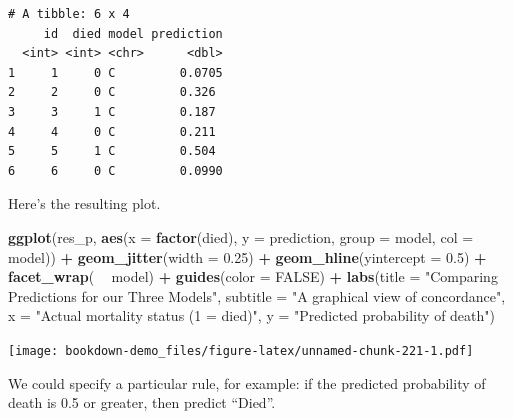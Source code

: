 \documentclass[]{book}
\newenvironment{Shaded}{\begin{snugshade}}{\end{snugshade}}
\newcommand{\KeywordTok}[1]{\textcolor[rgb]{0.13,0.29,0.53}{\textbf{#1}}}
\newcommand{\DataTypeTok}[1]{\textcolor[rgb]{0.13,0.29,0.53}{#1}}
\newcommand{\DecValTok}[1]{\textcolor[rgb]{0.00,0.00,0.81}{#1}}
\newcommand{\FloatTok}[1]{\textcolor[rgb]{0.00,0.00,0.81}{#1}}
\newcommand{\StringTok}[1]{\textcolor[rgb]{0.31,0.60,0.02}{#1}}
\newcommand{\OtherTok}[1]{\textcolor[rgb]{0.56,0.35,0.01}{#1}}
\newcommand{\OperatorTok}[1]{\textcolor[rgb]{0.81,0.36,0.00}{\textbf{#1}}}
\newcommand{\NormalTok}[1]{#1}
\theoremstyle{definition}
\theoremstyle{definition}
\theoremstyle{definition}
\theoremstyle{remark}
\begin{document}
\begin{verbatim}
# A tibble: 6 x 4
     id  died model prediction
  <int> <int> <chr>      <dbl>
1     1     0 C         0.0705
2     2     0 C         0.326 
3     3     1 C         0.187 
4     4     0 C         0.211 
5     5     1 C         0.504 
6     6     0 C         0.0990
\end{verbatim}

Here's the resulting plot.

\begin{Shaded}
\begin{Highlighting}[]
\KeywordTok{ggplot}\NormalTok{(res_p, }\KeywordTok{aes}\NormalTok{(}\DataTypeTok{x =} \KeywordTok{factor}\NormalTok{(died), }\DataTypeTok{y =}\NormalTok{ prediction, }
                  \DataTypeTok{group =}\NormalTok{ model, }\DataTypeTok{col =}\NormalTok{ model)) }\OperatorTok{+}
\StringTok{    }\KeywordTok{geom_jitter}\NormalTok{(}\DataTypeTok{width =} \FloatTok{0.25}\NormalTok{) }\OperatorTok{+}\StringTok{ }
\StringTok{    }\KeywordTok{geom_hline}\NormalTok{(}\DataTypeTok{yintercept =} \FloatTok{0.5}\NormalTok{) }\OperatorTok{+}
\StringTok{    }\KeywordTok{facet_wrap}\NormalTok{( }\OperatorTok{~}\StringTok{ }\NormalTok{model) }\OperatorTok{+}\StringTok{ }
\StringTok{    }\KeywordTok{guides}\NormalTok{(}\DataTypeTok{color =} \OtherTok{FALSE}\NormalTok{) }\OperatorTok{+}
\StringTok{    }\KeywordTok{labs}\NormalTok{(}\DataTypeTok{title =} \StringTok{"Comparing Predictions for our Three Models"}\NormalTok{,}
         \DataTypeTok{subtitle =} \StringTok{"A graphical view of concordance"}\NormalTok{,}
         \DataTypeTok{x =} \StringTok{"Actual mortality status (1 = died)"}\NormalTok{,}
         \DataTypeTok{y =} \StringTok{"Predicted probability of death"}\NormalTok{)}
\end{Highlighting}
\end{Shaded}

\texttt{[image: bookdown-demo\_files/figure-latex/unnamed-chunk-221-1.pdf]}

We could specify a particular rule, for example: if the predicted
probability of death is 0.5 or greater, then predict ``Died''.

\begin{Shaded}
\end{Shaded}
\end{document}
